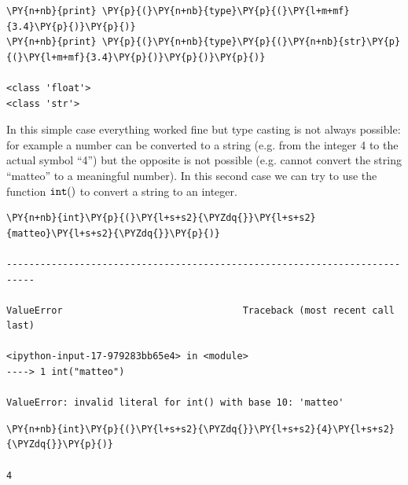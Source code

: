 \begin{codebox}[breakable, size=fbox, boxrule=1pt, pad at break*=1mm, colback=cellbackground, colframe=cellborder]            
\begin{Verbatim}[commandchars=\\\{\}]
\PY{n+nb}{print} \PY{p}{(}\PY{n+nb}{type}\PY{p}{(}\PY{l+m+mf}{3.4}\PY{p}{)}\PY{p}{)}
\PY{n+nb}{print} \PY{p}{(}\PY{n+nb}{type}\PY{p}{(}\PY{n+nb}{str}\PY{p}{(}\PY{l+m+mf}{3.4}\PY{p}{)}\PY{p}{)}\PY{p}{)}

<class 'float'>
<class 'str'>
\end{Verbatim}
\end{codebox}

In this simple case everything worked fine but type casting is not always possible: for example a number can be converted to a string (e.g. from the integer 4 to the actual symbol ``4'') but the opposite is not possible (e.g. cannot convert the string ``matteo'' to a meaningful number). In this second case we can try to use the function \(\tt{int()}\) to convert a string to an integer.

\begin{codebox}[breakable, size=fbox, boxrule=1pt, pad at break*=1mm, colback=cellbackground, colframe=cellborder]            
\begin{Verbatim}[commandchars=\\\{\}]
\PY{n+nb}{int}\PY{p}{(}\PY{l+s+s2}{\PYZdq{}}\PY{l+s+s2}{matteo}\PY{l+s+s2}{\PYZdq{}}\PY{p}{)}

---------------------------------------------------------------------------

ValueError                                Traceback (most recent call last)

<ipython-input-17-979283bb65e4> in <module>
----> 1 int("matteo")  

ValueError: invalid literal for int() with base 10: 'matteo'
\end{Verbatim}
\end{codebox}

\begin{codebox}[breakable, size=fbox, boxrule=1pt, pad at break*=1mm, colback=cellbackground, colframe=cellborder]            
\begin{Verbatim}[commandchars=\\\{\}]
\PY{n+nb}{int}\PY{p}{(}\PY{l+s+s2}{\PYZdq{}}\PY{l+s+s2}{4}\PY{l+s+s2}{\PYZdq{}}\PY{p}{)}

4
\end{Verbatim}
\end{codebox}

